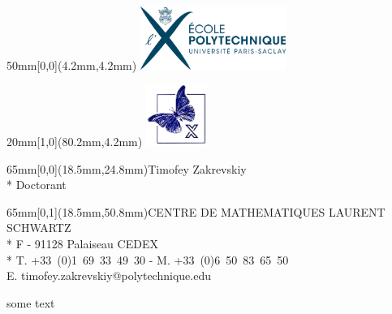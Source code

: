 \documentclass{article}
\makeatletter
\newcommand{\phonei}{T. +33~(0)1~69~33~49~30 - M.  +33~(0)6~50~83~65~50}%
\newcommand{\emailii}{timofey.zakrevskiy@polytechnique.edu}
\makeatother
\begin{document}
%
\begin{textblock*}{50mm}[0,0](4.2mm,4.2mm)%
\noindent%
\includegraphics[height=20.6mm]{LogohorEPS.eps}%
\end{textblock*}%
\begin{textblock*}{20mm}[1,0](80.2mm,4.2mm)%
\noindent%
\includegraphics[height=20mm]{LogoCMLSTZ.png}%
\end{textblock*}%
\setmainfont{EB Garamond}%
\fontsize{12}{14.4}\selectfont%
\begin{textblock*}{65mm}[0,0](18.5mm,24.8mm){\color{bl}\noindent Timofey Zakrevskiy\\*%
\setmainfont{EB Garamond}%
\fontsize{7}{7.5}\selectfont%
Doctorant%
}\end{textblock*} %
\setmainfont{TeX Gyre Adventor}%
 \fontsize{5.5}{7.5}\selectfont%
\begin{textblock*}{65mm}[0,1](18.5mm,50.8mm){\color{bl}\noindent CENTRE DE MATHEMATIQUES LAURENT SCHWARTZ\\*%
F - 91128 Palaiseau CEDEX\\*%
\phonei\\%
E. \emailii}\end{textblock*}%
\null\newpage%
some text
\end{document}
